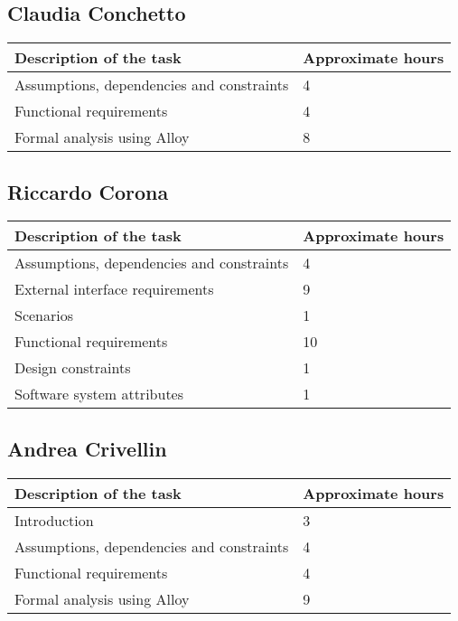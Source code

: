 
%

\subsection{Claudia Conchetto}
\begin{table}[h!]
\begin{tabular}{|l|l|}
\hline
\textbf{Description of the task} & \textbf{Approximate hours} \\ \hline
Assumptions, dependencies and constraints & 4 \\ \hline
Functional requirements & 4 \\ \hline
Formal analysis using Alloy & 8 \\ \hline
\end{tabular}
\end{table}

\subsection{Riccardo Corona}
\begin{table}[h!]
\begin{tabular}{|l|l|}
\hline
\textbf{Description of the task} & \textbf{Approximate hours} \\ \hline
Assumptions, dependencies and constraints & 4 \\ \hline
External interface requirements & 9 \\ \hline
Scenarios & 1 \\ \hline
Functional requirements & 10 \\ \hline
Design constraints & 1 \\ \hline
Software system attributes & 1 \\ \hline
\end{tabular}
\end{table}

\subsection{Andrea Crivellin}
\begin{table}[h!]
\begin{tabular}{|l|l|}
\hline
\textbf{Description of the task} & \textbf{Approximate hours} \\ \hline
Introduction & 3 \\ \hline
Assumptions, dependencies and constraints & 4 \\ \hline
Functional requirements & 4 \\ \hline
Formal analysis using Alloy & 9 \\ \hline
\end{tabular}
\end{table}

%